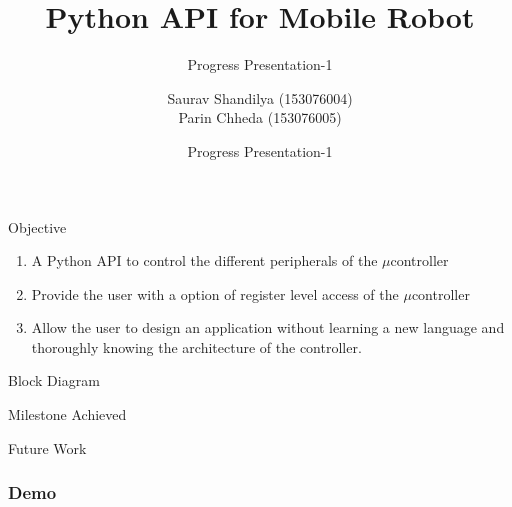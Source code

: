 \documentclass[10pt,handout,english]{beamer}
\title[] %
{Python API for Mobile Robot}
\subtitle{Progress Presentation-1}
\author[Author, Anders] %
{Saurav Shandilya (153076004) \\ Parin Chheda (153076005)}
\institute %
{
  Indian Institute of Technology Bombay
}
\date[\today] %
{Progress Presentation-1}
\begin{document}
\frame{\titlepage}

\begin{frame}{Objective}
\begin{enumerate}
	\item A Python API to control the different peripherals of the ${\mu}$controller
	\item Provide the user with a option of register level access of the ${\mu}$controller
	\item Allow the user to design an application without learning a new language and thoroughly knowing the architecture of the controller.
\end{enumerate}
\end{frame}

\begin{frame}{Block Diagram}

\end{frame}

\begin{frame}{Milestone Achieved}

\end{frame}

\begin{frame}{Future Work}

\end{frame}

\begin{frame}
\frametitle{Demo}

\begin{center}
\end{center}
\end{frame}
\end{document}
